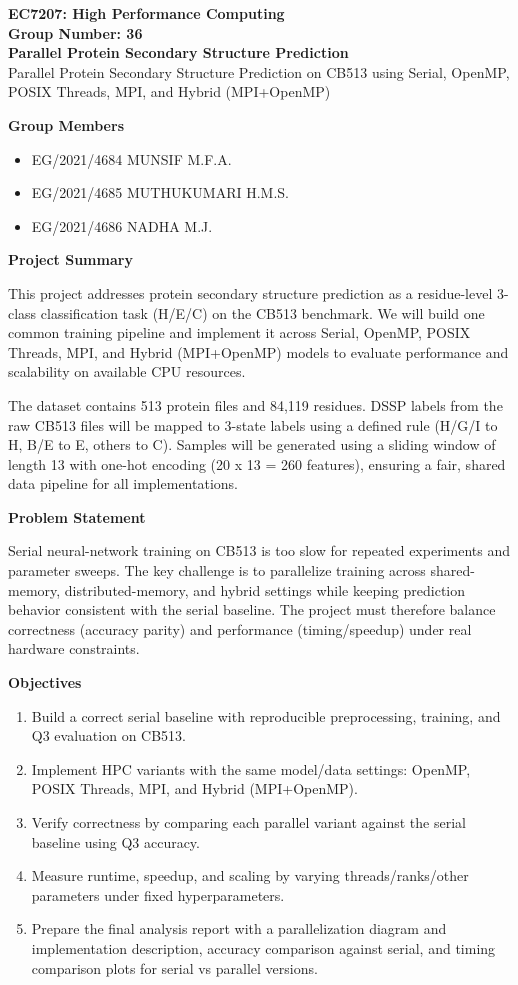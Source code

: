 \documentclass[11pt,a4paper]{article}
\begin{document}
\begin{center}
{\LARGE \textbf{EC7207: High Performance Computing}}\\[6pt]
{\large \textbf{Group Number: 36}}\\[6pt]
{\large \textbf{Parallel Protein Secondary Structure Prediction}}\\[8pt]
{\large Parallel Protein Secondary Structure Prediction on CB513 using Serial, OpenMP, POSIX Threads, MPI, and Hybrid (MPI+OpenMP)}
\end{center}

\textbf{Group Members}
\begin{itemize}
    \item EG/2021/4684 MUNSIF M.F.A.
    \item EG/2021/4685 MUTHUKUMARI H.M.S.
    \item EG/2021/4686 NADHA M.J.
\end{itemize}

\textbf{Project Summary}

This project addresses protein secondary structure prediction as a residue-level 3-class classification task (H/E/C) on the CB513 benchmark. We will build one common training pipeline and implement it across Serial, OpenMP, POSIX Threads, MPI, and Hybrid (MPI+OpenMP) models to evaluate performance and scalability on available CPU resources.

The dataset contains 513 protein files and 84,119 residues. DSSP labels from the raw CB513 files will be mapped to 3-state labels using a defined rule (H/G/I to H, B/E to E, others to C). Samples will be generated using a sliding window of length 13 with one-hot encoding (20 x 13 = 260 features), ensuring a fair, shared data pipeline for all implementations.

\textbf{Problem Statement}

Serial neural-network training on CB513 is too slow for repeated experiments and parameter sweeps. The key challenge is to parallelize training across shared-memory, distributed-memory, and hybrid settings while keeping prediction behavior consistent with the serial baseline. The project must therefore balance correctness (accuracy parity) and performance (timing/speedup) under real hardware constraints.

\textbf{Objectives}
\begin{enumerate}
    \item Build a correct serial baseline with reproducible preprocessing, training, and Q3 evaluation on CB513.
    \item Implement HPC variants with the same model/data settings: OpenMP, POSIX Threads, MPI, and Hybrid (MPI+OpenMP).
    \item Verify correctness by comparing each parallel variant against the serial baseline using Q3 accuracy.
    \item Measure runtime, speedup, and scaling by varying threads/ranks/other parameters under fixed hyperparameters.
    \item Prepare the final analysis report with a parallelization diagram and implementation description, accuracy comparison against serial, and timing comparison plots for serial vs parallel versions.
\end{enumerate}
\end{document}
